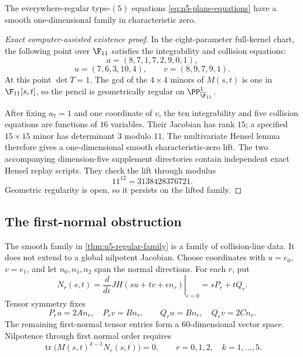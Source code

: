 \begin{theorem}
\label{thm:n5-regular-family}
The everywhere-regular type-\((5)\) equations
\eqref{eq:n5-plane-equations} have a smooth one-dimensional family in
characteristic zero.
\end{theorem}

\begin{proof}[Exact computer-assisted existence proof]
In the eight-parameter full-kernel chart, the following point over
\(\F_{11}\) satisfies the integrability and collision equations:
\[
a=(8,7,1,7,2,9,0,1),
\]
\[
u=(7,6,3,10,4),\qquad
v=(8,9,7,9,1).
\]
At this point \(\det T=1\).  The gcd of the \(4\times4\) minors of
\(M(s,t)\) is one in \(\F_{11}[s,t]\), so the pencil is geometrically
regular on \(\PP^1_{\overline{\F}_{11}}\).

After fixing \(a_7=1\) and one coordinate of \(v\), the ten integrability
and five collision equations are functions of \(16\) variables.  Their
Jacobian has rank \(15\); a specified \(15\times15\) minor has determinant
\(3\) modulo \(11\).  The multivariate Hensel lemma therefore gives a
one-dimensional smooth characteristic-zero lift.  The two accompanying
dimension-five supplement directories contain independent exact Hensel
replay scripts.  They check the lift through modulus
\[
11^{12}=3138428376721.
\]
Geometric regularity is open, so it persists on the lifted family.
\end{proof}

\subsection{The first-normal obstruction}

The smooth family in \cref{thm:n5-regular-family} is a family of
collision-line data.  It does not extend to a global nilpotent Jacobian.
Choose coordinates with \(u=e_0\), \(v=e_1\), and let
\(n_0,n_1,n_2\) span the normal directions.  For each \(r\), put
\[
N_r(s,t)=
\left.\frac{d}{d\epsilon}
JH(su+tv+\epsilon n_r)\right|_{\epsilon=0}
=sP_r+tQ_r.
\]
Tensor symmetry fixes
\[
P_ru=2An_r,\quad P_rv=Bn_r,\qquad
Q_ru=Bn_r,\quad Q_rv=2Cn_r.
\]
The remaining first-normal tensor entries form a \(60\)-dimensional vector
space.  Nilpotence through first normal order requires
\begin{equation}
\label{eq:first-normal-traces}
\operatorname{tr}\bigl(M(s,t)^{k-1}N_r(s,t)\bigr)=0,
\qquad r=0,1,2,\quad k=1,\ldots,5.
\end{equation}


